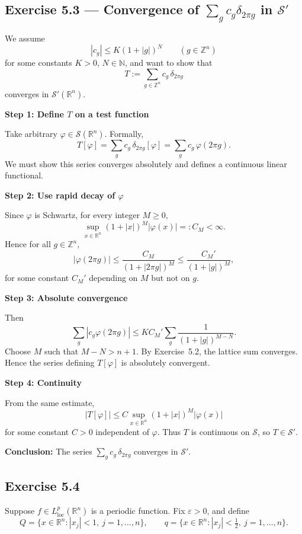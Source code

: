 \documentclass[12pt,a4paper]{article}
\theoremstyle{plain}
\theoremstyle{definition}
\theoremstyle{remark}
\theoremstyle{remark}
\begin{document}
\bigskip

\subsection*{Exercise 5.3 — Convergence of $\displaystyle \sum_{g} c_g \delta_{2\pi g}$ in $\mathcal{S}'$}

We assume
\[
|c_g| \le K(1+|g|)^N \qquad (g\in\mathbb{Z}^n)
\]
for some constants $K>0$, $N\in\mathbb{N}$, and want to show that
\[
T := \sum_{g\in\mathbb{Z}^n} c_g\,\delta_{2\pi g}
\]
converges in $\mathcal{S}'(\mathbb{R}^n)$.

\bigskip
\noindent\textbf{Step 1: Define $T$ on a test function}

Take arbitrary $\varphi\in\mathcal{S}(\mathbb{R}^n)$. Formally,
\[
T[\varphi]
= \sum_{g} c_g\,\delta_{2\pi g}[\varphi]
= \sum_{g} c_g\,\varphi(2\pi g).
\]
We must show this series converges absolutely and defines a continuous linear functional.

\bigskip
\noindent\textbf{Step 2: Use rapid decay of $\varphi$}

Since $\varphi$ is Schwartz, for every integer $M\ge 0$,
\[
\sup_{x\in\mathbb{R}^n} (1+|x|)^M |\varphi(x)| =: C_M < \infty.
\]
Hence for all $g\in\mathbb{Z}^n$,
\[
|\varphi(2\pi g)|
\le \frac{C_M}{(1+|2\pi g|)^M}
\le \frac{C_M'}{(1+|g|)^M},
\]
for some constant $C_M'$ depending on $M$ but not on $g$.

\bigskip
\noindent\textbf{Step 3: Absolute convergence}

Then
\[
\sum_{g} |c_g \varphi(2\pi g)|
\le K C_M' \sum_{g} \frac{1}{(1+|g|)^{M-N}}.
\]
Choose $M$ such that $M-N > n+1$.  
By Exercise~5.2, the lattice sum converges.  
Hence the series defining $T[\varphi]$ is absolutely convergent.

\bigskip
\noindent\textbf{Step 4: Continuity}

From the same estimate,
\[
|T[\varphi]|
\le C \sup_{x\in\mathbb{R}^n}(1+|x|)^M|\varphi(x)|
\]
for some constant $C>0$ independent of $\varphi$.  
Thus $T$ is continuous on $\mathcal{S}$, so $T\in\mathcal{S}'$.

\bigskip
\noindent\textbf{Conclusion:}  
The series $\displaystyle \sum_{g} c_g\,\delta_{2\pi g}$ converges in $\mathcal{S}'$.


\bigskip

\subsection*{Exercise 5.4}
Suppose $f \in L^p_{\mathrm{loc}}(\mathbb{R}^n)$ is a periodic function.
Fix $\varepsilon>0$, and define
\[
Q = \{x\in\mathbb{R}^n : |x_j| < 1,\ j=1,\dots,n\},
\qquad
q = \{x\in\mathbb{R}^n : |x_j| < \tfrac12,\ j=1,\dots,n\}.
\]
\end{document}
